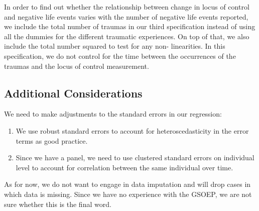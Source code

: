 \documentclass{scrartcl}
\begin{document}
In order to find out whether the relationship between change in locus of
control and negative life events varies with the number of negative life events
reported, we include the total number of traumas in our third specification
instead of using all the dummies for the different traumatic experiences. On
top of that, we also include the total number squared to test for any non-
linearities. In this specification, we do not control for the time between the
occurrences of the traumas and the locus of control measurement.


\subsection{Additional Considerations} %
\label{sub:additional_considerations}


We need to make adjustments to the standard errors in our regression:
\begin{enumerate}
    \item We use robust standard errors to account for heteroscedasticity in
    the error terms as good practice.
    \item Since we have a panel, we need to use clustered standard errors on
    individual level to account for correlation between the same individual
    over time.
\end{enumerate}

As for now, we do not want to engage in data imputation and will drop cases in
which data is missing. Since we have no experience with the GSOEP, we are not
sure whether this is the final word.


\printbibliography
\end{document}
